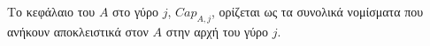 {}
\begin{definition}[Κεφάλαιο]
  Το κεφάλαιο του $A$ στο γύρο $j$, $Cap_{A, j}$, ορίζεται ως τα συνολικά νομίσματα που ανήκουν αποκλειστικά στον $A$ στην
  αρχή του γύρο $j$.
\end{definition}
